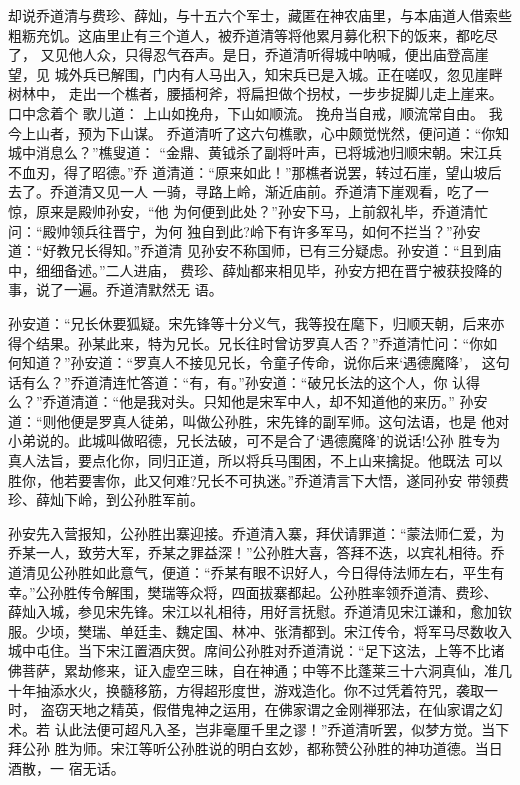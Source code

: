 却说乔道清与费珍、薛灿，与十五六个军士，藏匿在神农庙里，与本庙道人借索些
粗粝充饥。这庙里止有三个道人，被乔道清等将他累月募化积下的饭来，都吃尽了，
又见他人众，只得忍气吞声。是日，乔道清听得城中呐喊，便出庙登高崖望，见
城外兵已解围，门内有人马出入，知宋兵已是入城。正在嗟叹，忽见崖畔树林中，
走出一个樵者，腰插柯斧，将扁担做个拐杖，一步步捉脚儿走上崖来。口中念着个
歌儿道：
上山如挽舟，下山如顺流。
挽舟当自戒，顺流常自由。
我今上山者，预为下山谋。
乔道清听了这六句樵歌，心中颇觉恍然，便问道：“你知城中消息么？”樵叟道：
“金鼎、黄钺杀了副将叶声，已将城池归顺宋朝。宋江兵不血刃，得了昭德。”乔
道清道：“原来如此！”那樵者说罢，转过石崖，望山坡后去了。乔道清又见一人
一骑，寻路上岭，渐近庙前。乔道清下崖观看，吃了一惊，原来是殿帅孙安，“他
为何便到此处？”孙安下马，上前叙礼毕，乔道清忙问：“殿帅领兵往晋宁，为何
独自到此?岭下有许多军马，如何不拦当？”孙安道：“好教兄长得知。”乔道清
见孙安不称国师，已有三分疑虑。孙安道：“且到庙中，细细备述。”二人进庙，
费珍、薛灿都来相见毕，孙安方把在晋宁被获投降的事，说了一遍。乔道清默然无
语。

孙安道：“兄长休要狐疑。宋先锋等十分义气，我等投在麾下，归顺天朝，后来亦
得个结果。孙某此来，特为兄长。兄长往时曾访罗真人否？”乔道清忙问：“你如
何知道？”孙安道：“罗真人不接见兄长，令童子传命，说你后来‘遇德魔降’，
这句话有么？”乔道清连忙答道：“有，有。”孙安道：“破兄长法的这个人，你
认得么？”乔道清道：“他是我对头。只知他是宋军中人，却不知道他的来历。”
孙安道：“则他便是罗真人徒弟，叫做公孙胜，宋先锋的副军师。这句法语，也是
他对小弟说的。此城叫做昭德，兄长法破，可不是合了‘遇德魔降’的说话!公孙
胜专为真人法旨，要点化你，同归正道，所以将兵马围困，不上山来擒捉。他既法
可以胜你，他若要害你，此又何难?兄长不可执迷。”乔道清言下大悟，遂同孙安
带领费珍、薛灿下岭，到公孙胜军前。

孙安先入营报知，公孙胜出寨迎接。乔道清入寨，拜伏请罪道：“蒙法师仁爱，为
乔某一人，致劳大军，乔某之罪益深！”公孙胜大喜，答拜不迭，以宾礼相待。乔
道清见公孙胜如此意气，便道：“乔某有眼不识好人，今日得侍法师左右，平生有
幸。”公孙胜传令解围，樊瑞等众将，四面拔寨都起。公孙胜率领乔道清、费珍、
薛灿入城，参见宋先锋。宋江以礼相待，用好言抚慰。乔道清见宋江谦和，愈加钦
服。少顷，樊瑞、单廷圭、魏定国、林冲、张清都到。宋江传令，将军马尽数收入
城中屯住。当下宋江置酒庆贺。席间公孙胜对乔道清说：“足下这法，上等不比诸
佛菩萨，累劫修来，证入虚空三昧，自在神通；中等不比蓬莱三十六洞真仙，准几
十年抽添水火，换髓移筋，方得超形度世，游戏造化。你不过凭着符咒，袭取一时，
盗窃天地之精英，假借鬼神之运用，在佛家谓之金刚禅邪法，在仙家谓之幻术。若
认此法便可超凡入圣，岂非毫厘千里之谬！”乔道清听罢，似梦方觉。当下拜公孙
胜为师。宋江等听公孙胜说的明白玄妙，都称赞公孙胜的神功道德。当日酒散，一
宿无话。

